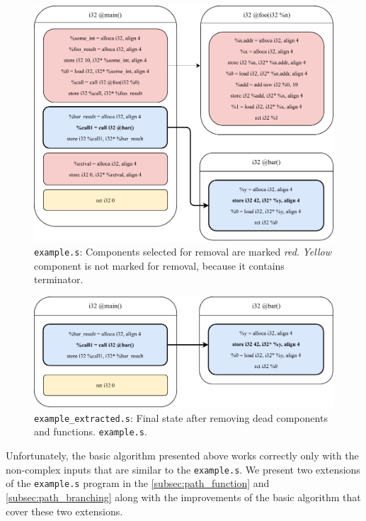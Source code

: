 \documentclass[12pt, twoside]{fithesis2}
\renewcommand{\_}{\leavevmode \kern0.07em\vbox{\hrule width0.4em}}
\begin{document}
\begin{figure}[ht]
    \centering
    \includegraphics[]{images/main_removing_prepare.pdf}
    \caption{
    \texttt{example.s}:
    Components selected for removal are marked \emph{red}.
    \emph{Yellow} component is not marked for removal, because it contains
    terminator.
    }
    \label{fig:removing_prepare}
\end{figure}

\begin{figure}[ht]
    \centering
    \includegraphics[]{images/main_removing_done.pdf}
    \caption{
    \texttt{example_extracted.s}:
    Final state after removing dead components and functions.
    \texttt{example.s}.
    }
    \label{fig:removing_done}
\end{figure}


Unfortunately, the basic algorithm presented above works correctly only with the
non-complex inputs that are similar to the \texttt{example.s}.
We present two extensions of the \texttt{example.s} program in the
\autoref{subsec:path_function} and \autoref{subsec:path_branching}
along with the improvements of the basic algorithm that cover these two
extensions.
\end{document}
